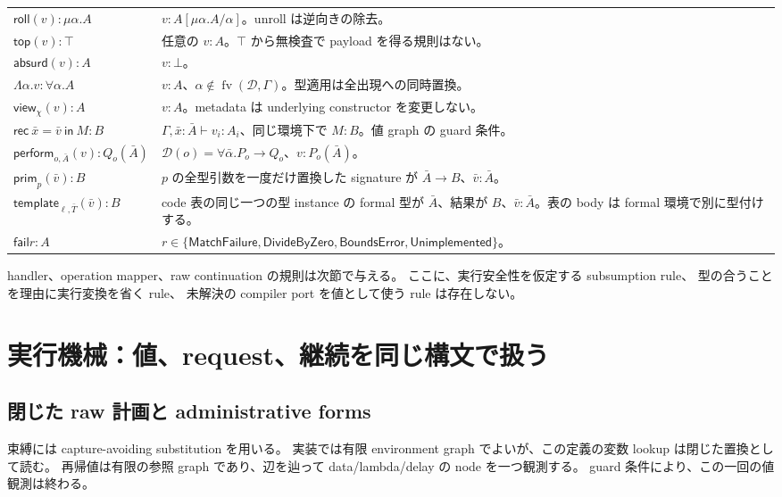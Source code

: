 \documentclass[11pt,a4paper]{article}
\newcommand{\Fail}{\mathsf{fail}}
\newcommand{\View}{\mathsf{view}}
\newcommand{\fv}{\operatorname{fv}}
\newcommand{\D}{\mathcal D}
\newcommand{\ty}{\mathrel{\vdash}}
\begin{document}
\begin{longtable}{p{}p{}}
\(\mathsf{roll}(v):\mu\alpha.A\) & \(v:A[\mu\alpha.A/\alpha]\)。unroll は逆向きの除去。\\
\(\mathsf{top}(v):\top\) & 任意の \(v:A\)。\(\top\) から無検査で payload を得る規則はない。\\
\(\mathsf{absurd}(v):A\) & \(v:\bot\)。\\
\(\Lambda\alpha.v:\forall\alpha.A\) & \(v:A\)、\(\alpha\notin\fv(\D,\Gamma)\)。型適用は全出現への同時置換。\\
\(\View_\chi(v):A\) & \(v:A\)。metadata は underlying constructor を変更しない。\\
\(\mathsf{rec}\ \bar x=\bar v\ \mathsf{in}\ M:B\) & \(\Gamma,\bar x:\bar A\ty v_i:A_i\)、同じ環境下で \(M:B\)。値 graph の guard 条件。\\
\(\mathsf{perform}_{o,\bar A}(v):Q_o(\bar A)\) & \(\D(o)=\forall\bar\alpha.P_o\to Q_o\)、\(v:P_o(\bar A)\)。\\
\(\mathsf{prim}_p(\bar v):B\) & \(p\) の全型引数を一度だけ置換した signature が \(\bar A\to B\)、\(\bar v:\bar A\)。\\
\(\mathsf{template}_{\ell,\bar T}(\bar v):B\) & code 表の同じ一つの型 instance の formal 型が \(\bar A\)、結果が \(B\)、\(\bar v:\bar A\)。表の body は formal 環境で別に型付けする。\\
\(\Fail r:A\) & \(r\in\{\mathsf{MatchFailure},\mathsf{DivideByZero},\mathsf{BoundsError},\mathsf{Unimplemented}\}\)。\\
\bottomrule
\end{longtable}

handler、operation mapper、raw continuation の規則は次節で与える。
ここに、実行安全性を仮定する subsumption rule、
型の合うことを理由に実行変換を省く rule、
未解決の compiler port を値として使う rule は存在しない。

\section{実行機械：値、request、継続を同じ構文で扱う}
\label{sec:machine}

\subsection{閉じた raw 計画と administrative forms}

束縛には capture-avoiding substitution を用いる。
実装では有限 environment graph でよいが、この定義の変数 lookup は閉じた置換として読む。
再帰値は有限の参照 graph であり、辺を辿って data/lambda/delay の node を一つ観測する。
guard 条件により、この一回の値観測は終わる。
\end{document}
